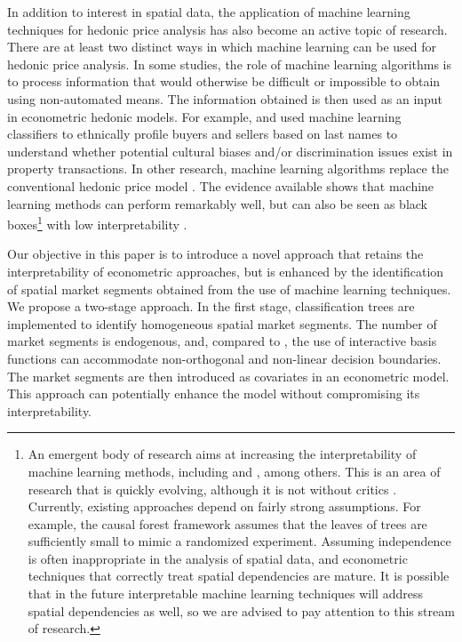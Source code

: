 \documentclass[Royal,times,sageh]{sagej}
\begin{document}
In addition to interest in spatial data, the application of machine
learning techniques for hedonic price analysis has also become an active
topic of research. There are at least two distinct ways in which machine
learning can be used for hedonic price analysis. In some studies, the
role of machine learning algorithms is to process information that would
otherwise be difficult or impossible to obtain using non-automated
means. The information obtained is then used as an input in econometric
hedonic models. For example, \citet{Humphreys2019superstition} and
\citet{Nowak2018homeowner} used machine learning classifiers to
ethnically profile buyers and sellers based on last names to understand
whether potential cultural biases and/or discrimination issues exist in
property transactions. In other research, machine learning algorithms
replace the conventional hedonic price model
\citep{Hu2019monitoring, Yoo2012variable, Fuss2016role}. The evidence
available shows that machine learning methods can perform remarkably
well, but can also be seen as black boxes\footnote{An emergent body of
  research aims at increasing the interpretability of machine learning
  methods, including \citet{du2019techniques} and
  \citet{murdoch2019definitions}, among others. This is an area of
  research that is quickly evolving, although it is not without critics
  \citep[e.g.,][]{rudin2019stop}. Currently, existing approaches depend
  on fairly strong assumptions. For example, the causal forest framework
  \citep{wager2018estimation, knaus2021machine} assumes that the leaves
  of trees are sufficiently small to mimic a randomized experiment.
  Assuming independence is often inappropriate in the analysis of
  spatial data, and econometric techniques that correctly treat spatial
  dependencies are mature. It is possible that in the future
  interpretable machine learning techniques will address spatial
  dependencies as well, so we are advised to pay attention to this
  stream of research.} with low interpretability \citep[see page 25
in][]{James2013introduction}.

Our objective in this paper is to introduce a novel approach that
retains the interpretability of econometric approaches, but is enhanced
by the identification of spatial market segments obtained from the use
of machine learning techniques. We propose a two-stage approach. In the
first stage, classification trees are implemented to identify
homogeneous spatial market segments. The number of market segments is
endogenous, and, compared to \citet{Fuss2016role}, the use of
interactive basis functions \citep[see][]{Paez2019inducing} can
accommodate non-orthogonal and non-linear decision boundaries. The
market segments are then introduced as covariates in an econometric
model. This approach can potentially enhance the model without
compromising its interpretability.
\end{document}

